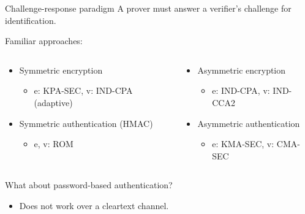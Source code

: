 \begin{frame}{Challenge-response paradigm}
  A prover must answer a verifier's challenge for identification.

  \vspace*{1em}

  \pause
  Familiar approaches:
  \begin{columns}[T,onlytextwidth]
    \begin{column}{0.5\textwidth}
      \begin{itemize}[<+(1)->]
        \item Symmetric encryption
        \begin{itemize}
          \item e: KPA-SEC, v: IND-CPA (adaptive)
        \end{itemize}
        \item Symmetric authentication (HMAC)
        \begin{itemize}
          \item e, v: ROM
        \end{itemize}
      \end{itemize}
    \end{column}
    \begin{column}{0.5\textwidth}
      \begin{itemize}[<+(1)->]
        \item Asymmetric encryption
        \begin{itemize}
          \item e: IND-CPA, v: IND-CCA2
        \end{itemize}
        \item Asymmetric authentication
        \begin{itemize}
          \item e: KMA-SEC, v: CMA-SEC
        \end{itemize}
      \end{itemize}
    \end{column}
  \end{columns}

  \vspace*{1.5em}

  \pause
  What about password-based authentication?
  \begin{itemize}[<+(1)->]
    \item Does not work over a cleartext channel.
  \end{itemize}
\end{frame}

